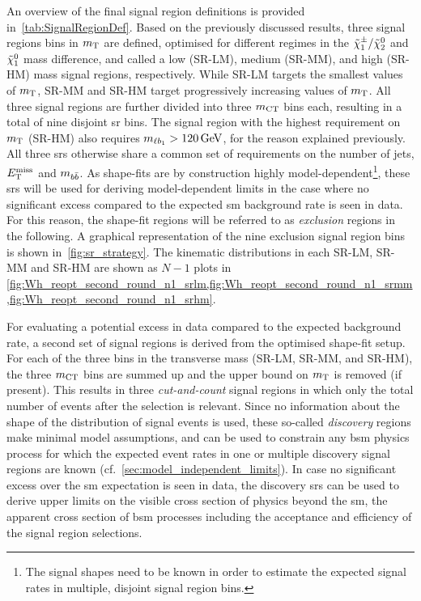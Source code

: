 An overview of the final signal region definitions is provided in~\cref{tab:SignalRegionDef}.
Based on the previously discussed results, three signal regions bins in $m_{\textrm{T}}$ are defined, optimised for different regimes in the $\tilde{\chi}_1^\pm/\tilde{\chi}_2^0$ and $\tilde{\chi}_1^0$ mass difference, and called a low (SR-LM), medium (SR-MM), and high (SR-HM) mass signal regions, respectively.
While SR-LM targets the smallest values of $m_{\textrm{T}}$, SR-MM and SR-HM target progressively increasing values of $m_{\textrm{T}}$.
All three signal regions are further divided into three $m_{\textrm{CT}}$ bins each, resulting in a total of nine disjoint \gls{sr} bins. The signal region with the highest requirement on $m_{\textrm{T}}$ (SR-HM) also requires $\mlb>\SI{120}{\GeV}$, for the reason explained previously.
All three \glspl{sr} otherwise share a common set of requirements on the number of jets, $E_{\textrm{T}}^{\textrm{miss}}$ and $m_{b\bar{b}}$.
As shape-fits are by construction highly model-dependent\footnote{The signal shapes need to be known in order to estimate the expected signal rates in multiple, disjoint signal region bins.}, these \glspl{sr} will be used for deriving model-dependent limits in the case where no significant excess compared to the expected \gls{sm} background rate is seen in data.
For this reason, the shape-fit regions will be referred to as \textit{exclusion} regions in the following. A graphical representation of the nine exclusion signal region bins is shown in~\cref{fig:sr_strategy}.
The kinematic distributions in each SR-LM, SR-MM and SR-HM are shown as $N-1$ plots in \cref{fig:Wh_reopt_second_round_n1_srlm,fig:Wh_reopt_second_round_n1_srmm,fig:Wh_reopt_second_round_n1_srhm}.

For evaluating a potential excess in data compared to the expected background rate, a second set of signal regions is derived from the optimised shape-fit setup.
For each of the three bins in the transverse mass (SR-LM, SR-MM, and SR-HM), the three $m_{\textrm{CT}}$ bins are summed up and the upper bound on $m_{\textrm{T}}$ is removed (if present).
This results in three \textit{cut-and-count} signal regions in which only the total number of events after the selection is relevant. Since no information about the shape of the distribution of signal events is used, these so-called \textit{discovery} regions make minimal model assumptions, and can be used to constrain any \gls{bsm} physics process for which the expected event rates in one or multiple discovery signal regions are known (cf.~\cref{sec:model_independent_limits}).
In case no significant excess over the \gls{sm} expectation is seen in data, the discovery \glspl{sr} can be used to derive upper limits on the visible cross section of physics beyond the \gls{sm}, \ie the apparent cross section of \gls{bsm} processes including the acceptance and efficiency of the signal region selections. 


